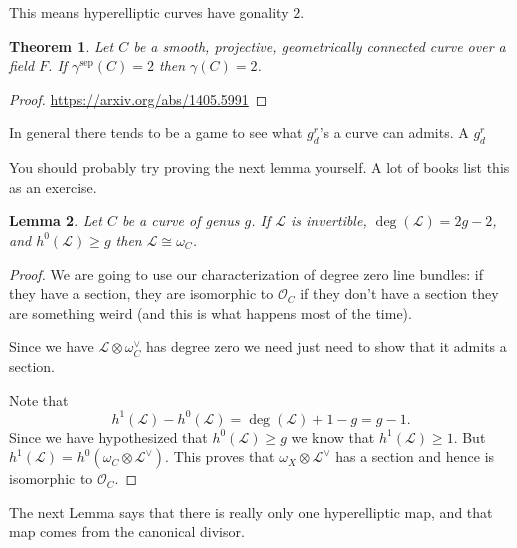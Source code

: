 \documentclass[12pt]{article}
\numberwithin{equation}{section}
\newtheorem{theorem}{Theorem}[subsection]
\newtheorem{lemma}[theorem]{Lemma}
\theoremstyle{definition}
\theoremstyle{remark}
\newcommand{\Ocal}{\mathcal{O}}
\newcommand{\Lcal}{\mathcal{L}}
\newcommand{\sep}{\operatorname{sep}}
\begin{document}
This means hyperelliptic curves have gonality $2$.  
\begin{theorem}
	Let $C$ be a smooth, projective, geometrically connected curve over a field $F$.
	If $\gamma^{\sep}(C)=2$ then $\gamma(C)=2$. 
\end{theorem}
\begin{proof}
	\url{https://arxiv.org/abs/1405.5991}
\end{proof}
In general there tends to be a game to see what $g^r_d$'s a curve can admits. 
A $g^r_d$ 


You should probably try proving the next lemma yourself. 
A lot of books list this as an exercise. 
\begin{lemma}
	Let $C$ be a curve of genus $g$. 
	If $\Lcal$ is invertible, $\deg(\Lcal)=2g-2$, and $h^0(\Lcal)\geq g$ then $\Lcal\cong \omega_C$. 
\end{lemma}
\begin{proof}
	We are going to use our characterization of degree zero line bundles: if they have a section, they are isomorphic to $\Ocal_C$ if they don't have a section they are something weird (and this is what happens most of the time). 
	
	Since we have $\Lcal\otimes \omega_C^{\vee}$ has degree zero we need just need to show that it admits a section. 
	
	Note that 
	$$ h^1(\Lcal) - h^0(\Lcal) = \deg(\Lcal)+1-g = g-1.$$
	Since we have hypothesized that $h^0(\Lcal)\geq g$ we know that $h^1(\Lcal)\geq 1$. 
	But $h^1(\Lcal)=h^0(\omega_C\otimes \Lcal^{\vee})$.
	This proves that $\omega_X\otimes\Lcal^{\vee}$ has a section and hence is isomorphic to $\Ocal_C$.
\end{proof}

The next Lemma says that there is really only one hyperelliptic map, and that map comes from the canonical divisor. 
\end{document}
